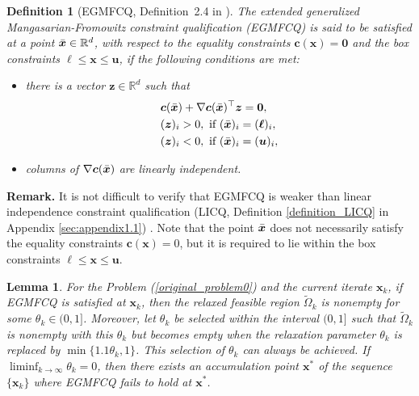 \documentclass[aos]{imsart}
\numberwithin{equation}{section}
\theoremstyle{plain}
\newtheorem{definition}{Definition}
\newtheorem{lemma}{Lemma}
\begin{document}
\begin{definition}
    [EGMFCQ, Definition~2.4 in \cite{xu2015smoothing}] 
    \label{def_MFCQ}
    The extended generalized Mangasarian-Fromowitz constraint qualification (EGMFCQ) is said to be satisfied at a point $\Bar{\bm{x}} \in \mathbb{R}^{d}$, with respect to the equality constraints $\bm{c}(\bm{x}) = \bm{0}$ and the box constraints $\bm{\ell} \leq \bm{x} \leq \bm{u}$, if the following conditions are met:
    \begin{itemize}
        \item there is a vector $\bm{z} \in \mathbb{R}^{d}$ such that
        \begin{equation}
        \label{MFCQ_z}
            \begin{split}
                & \bm{c}(\Bar{\bm{x}}) + \nabla \bm{c}(\Bar{\bm{x}})^{\top} \bm{z} = \bm{0}, \\
                & (\bm{z})_i >0,~\text{if}~(\Bar{\bm{x}})_{i} = (\bm{\ell})_i,\\
                & (\bm{z})_i < 0,~\text{if}~(\Bar{\bm{x}})_{i} = (\bm{u})_i,
            \end{split}
        \end{equation}

        \item columns of $\nabla \bm{c}(\Bar{\bm{x}})$ are linearly independent. 
    \end{itemize}
\end{definition}

\textbf{Remark.} It is not difficult to verify that EGMFCQ is weaker than linear independence constraint qualification (LICQ, Definition \ref{definition_LICQ} in Appendix \ref{sec:appendix1.1}) \cite[Definition~12.4]{jorge2006numerical}. 
Note that the point $\Bar{\bm{x}}$ does not necessarily satisfy the equality constraints $\bm{c}(\bm{x}) = 0$, but it is required to lie within the box constraints $\bm{\ell} \leq \bm{x} \leq \bm{u}$. 




\begin{lemma}
\label{prop_thetak_to_0}
    For the Problem (\ref{original_problem0}) and the current iterate $\bm{x}_k$, if EGMFCQ is satisfied at $\bm{x}_k$, then the relaxed feasible region $\widetilde{\Omega}_k$ is nonempty for some $\theta_k \in (0,1]$. Moreover, let $\theta_k$ be selected within the interval $(0,1]$ such that $\widetilde{\Omega}_k$ is nonempty with this $\theta_k$ but becomes empty when the relaxation parameter $\theta_k$ is replaced by $\min\{1.1\theta_k,1\}$. This selection of $\theta_k$ can always be achieved. If $\mathop{\lim \inf}_{k \to \infty} \theta_k = 0$, then there exists an accumulation point $\bm{x}^{*}$ of the sequence $\{\bm{x}_k\}$ where EGMFCQ fails to hold at $\bm{x}^{*}$.
\end{lemma}
\end{document}
